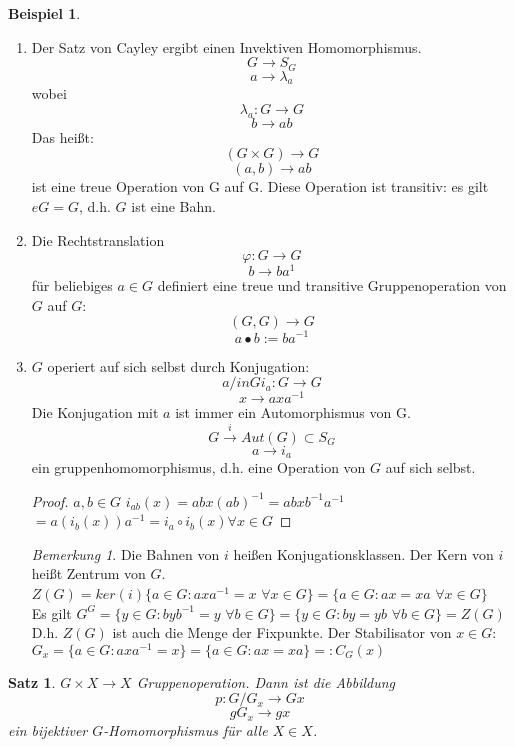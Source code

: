 \documentclass[12pt]{scrartcl}%
\newtheorem{thm}{Satz}
\theoremstyle{definition}
\newtheorem{ex}{Beispiel}
\theoremstyle{remark}
\newtheorem*{nb}{Bemerkung}
\begin{document}
	\begin{ex}
	\begin{enumerate}
		\item Der Satz von Cayley ergibt einen Invektiven Homomorphismus.
		$$G \rightarrow S_G$$
		$$a \rightarrow \lambda_a$$
		wobei
		$$\lambda_a: G \rightarrow G$$
		$$b \rightarrow ab$$
		Das heißt: 
		$$(G\times G) \rightarrow G$$
		$$(a,b) \rightarrow ab$$
		ist eine treue Operation von G auf G.
		Diese Operation ist transitiv: es gilt $eG=G$, d.h. $G$ ist eine Bahn.
		
		\item Die Rechtstranslation
		$$\varphi : G \rightarrow G$$
		$$b \rightarrow ba^{1}$$
		für beliebiges $a\in G$ definiert eine treue und transitive Gruppenoperation von $G$ auf $G$:
		$$(G,G) \rightarrow G$$
		$$a \bullet b := ba^{-1}$$	
		
		\item $G$ operiert auf sich selbst durch Konjugation:
		$$a /in G i_a : G \rightarrow G$$
		$$x \rightarrow axa^{-1}$$	
		Die Konjugation mit $a$ ist immer ein Automorphismus von G.
		$$G \xrightarrow{i} Aut(G) \subset S_G$$
		$$a \rightarrow i_a$$
		ein gruppenhomomorphismus, d.h. eine Operation von $G$ auf sich selbst.
		\begin{proof}
		$a,b \in G$ $i_{ab}(x)=abx(ab)^{-1}=abxb^{-1}a^{-1}$\\
		$=a(i_b(x))a^{-1}=i_a\circ i_b(x) \forall x\in G$
		\end{proof}
		\begin{nb}
		Die Bahnen von $i$ heißen Konjugationsklassen. Der Kern von $i$ heißt Zentrum von $G$.\\
		$Z(G)=ker(i)\{ a \in G : axa^{-1}=x$ $\forall x \in G\} = \{a \in G : ax =xa$ $\forall x \in G\}$\\
		Es gilt $G^G=\{ y \in G : byb^{-1}=y$ $\forall b \in G\}=\{ y \in G : by =yb$ $\forall b \in G\}=Z(G)$\\
		
		D.h. $Z(G)$ ist auch die Menge der Fixpunkte. Der Stabilisator von $x \in G$:\\
		$G_x=\{a \in G : axa^{-1}=x\}=\{ a \in G : ax = xa\}=:C_G(x)$
		\end{nb}		
	\end{enumerate}
	\end{ex}
	
	\begin{thm}
	$G \times X \rightarrow X$ Gruppenoperation. Dann ist die Abbildung
	$$p: G/G_x \rightarrow Gx$$
	$$gG_x \rightarrow gx$$
	ein bijektiver $G$-Homomorphismus für alle $X \in X$.
	\end{thm}
	
\end{document}
